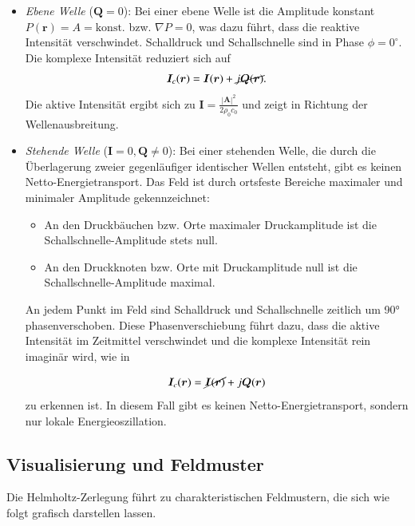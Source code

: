 \begin{itemize}


 
\item \emph{Ebene Welle} ($\boldsymbol{Q} = 0$):
%
Bei einer ebene Welle ist die Amplitude konstant $P(\boldsymbol{r})
= A = \text{konst.}$ bzw. $\nabla P = 0$, was dazu führt, dass die
reaktive Intensität verschwindet. Schalldruck und Schallschnelle
sind in Phase $\phi = 0^{\circ}$. Die komplexe Intensität reduziert
sich auf
\begin{equation*}
\boldsymbol{I}_c (\boldsymbol{r})
=
\boldsymbol{I}(\boldsymbol{r}) + \cancel{j\boldsymbol{Q}(\boldsymbol{r})}.
\end{equation*}
Die aktive Intensität ergibt sich zu
$\boldsymbol{I} = \frac{|\boldsymbol{A}|^2}{2 \rho_0 c_0}$
und zeigt in Richtung der
Wellenausbreitung.
 
\item \emph{Stehende Welle} ($\boldsymbol{I} = 0, \boldsymbol{Q} \neq 0$):
%
Bei einer stehenden Welle, die durch die Überlagerung zweier
gegenläufiger identischer Wellen entsteht, gibt es keinen
Netto-Energietransport. Das Feld ist durch ortsfeste Bereiche
maximaler und minimaler Amplitude gekennzeichnet:
    \begin{itemize}
	\item An den Druckbäuchen bzw. Orte maximaler Druckamplitude
	ist die Schall\-schnel\-le-Amplitude stets null.
%
	\item An den Druckknoten bzw. Orte mit Druckamplitude null
	ist die Schall\-schnel\-le-Amplitude maximal.
%
    \end{itemize}
An jedem Punkt im Feld sind Schalldruck und Schallschnelle zeitlich um 90° phasenverschoben. Diese Phasenverschiebung führt dazu, dass die aktive Intensität im Zeitmittel verschwindet und die komplexe Intensität rein imaginär wird, wie in 
 
\begin{equation*}
\boldsymbol{I}_c (\boldsymbol{r})
=
\cancel{\boldsymbol{I}(\boldsymbol{r})} + j\boldsymbol{Q}(\boldsymbol{r})
\end{equation*}
zu erkennen ist. In diesem Fall gibt es keinen Netto-Energietransport, sondern nur lokale Energieoszillation.
\end{itemize}



\subsection{Visualisierung und Feldmuster
\label{helmholtz:subsection:Visualisierung}}
Die Helmholtz-Zerlegung führt zu charakteristischen Feldmustern, die sich wie folgt grafisch darstellen lassen.
 
